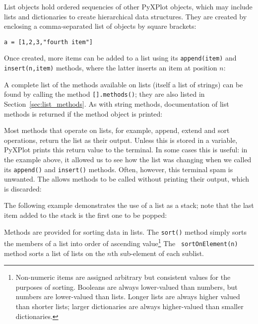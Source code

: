 List objects hold ordered sequencies of other PyXPlot objects, which may
include lists and dictionaries to create hierarchical data structures. They are
created by enclosing a comma-separated list of objects by square brackets:

\begin{verbatim}
a = [1,2,3,"fourth item"]
\end{verbatim}

Once created, more items can be added to a list using its {\tt append(item)}
and {\tt insert(n,item)} methods, where the latter inserts an item at position
$n$:

\vspace{3mm}

\vspace{3mm}

\noindent
A complete list of the methods available on lists (itself a list of strings)
can be found by calling the method {\tt [].methods()}; they are also listed in
Section~\ref{sec:list_methods}. As with string methods, documentation of list
methods is returned if the method object is printed:

\vspace{3mm}

\vspace{3mm}

Most methods that operate on lists, for example, append, extend and sort
operations, return the list as their output. Unless this is stored in a
variable, PyXPlot prints this return value to the terminal. In some cases this
is useful: in the example above, it allowed us to see how the list was changing
when we called its {\tt append()} and {\tt insert()} methods. Often, however,
this terminal spam is unwanted. The  allows methods to be called
without printing their output, which is discarded:

\vspace{3mm}

\vspace{3mm}

The following example demonstrates the use of a list as a stack; note that the
last item added to the stack is the first one to be popped:

\vspace{3mm}

\vspace{3mm}

Methods are provided for sorting data in lists. The {\tt sort()} method simply
sorts the members of a list into order of ascending value\footnote{Non-numeric
items are assigned arbitrary but consistent values for the purposes of sorting.
Booleans are always lower-valued than numbers, but numbers are lower-valued
than lists. Longer lists are always higher valued than shorter lists; larger
dictionaries are always higher-valued than smaller dictionaries.} The {\tt
sortOnElement(n)} method sorts a list of lists on the $n$th sub-element of each
sublist.

